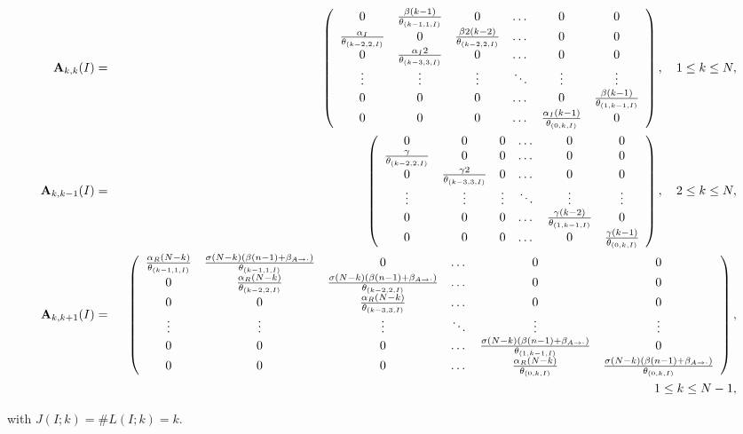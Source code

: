 \documentclass[10pt,A4paper]{article}
\begin{document}
\begin{eqnarray*}
 {\bf A}_{k,k}(I) &=& \left(\begin{array}{cccccc}
0 & \frac{\beta(k-1)}{\theta_{(k-1,1,I)}} & 0 & \dots & 0 & 0\\
\frac{\alpha_I}{\theta_{(k-2,2,I)}} & 0 & \frac{\beta2(k-2)}{\theta_{(k-2,2,I)}} & \dots & 0 & 0\\
0 & \frac{\alpha_I2}{\theta_{(k-3,3,I)}} & 0 & \dots & 0 & 0\\
\vdots & \vdots & \vdots & \ddots & \vdots & \vdots\\
0 & 0 & 0 & \dots & 0 & \frac{\beta(k-1)}{\theta_{(1,k-1,I)}}\\
0 & 0 & 0 & \dots & \frac{\alpha_I (k-1)}{\theta_{(0,k,I)}} & 0
                        \end{array}\right),\quad 1\leq k\leq N,\\
 {\bf A}_{k,k-1}(I) &=& \left(\begin{array}{cccccc}
0 & 0 & 0 & \dots & 0 & 0\\
\frac{\gamma}{\theta_{(k-2,2,I)}} & 0 & 0 & \dots & 0 & 0\\
0 & \frac{\gamma2}{\theta_{(k-3,3,I)}} & 0 & \dots & 0 & 0\\
\vdots & \vdots & \vdots & \ddots & \vdots & \vdots\\
0 & 0 & 0 & \dots & \frac{\gamma(k-2)}{\theta_{(1,k-1,I)}} & 0\\
0 & 0 & 0 & \dots & 0 & \frac{\gamma (k-1)}{\theta_{(0,k,I)}}
                        \end{array}\right),\quad 2\leq k\leq N,\\
 {\bf A}_{k,k+1}(I) &=& \left(\begin{array}{cccccc}
\frac{\alpha_R(N-k)}{\theta_{(k-1,1,I)}} & \frac{\sigma(N-k)(\beta(n-1)+\beta_{A\rightarrow\cdot})}{\theta_{(k-1,1,I)}} & 0 & \dots & 0 & 0\\
0 & \frac{\alpha_R(N-k)}{\theta_{(k-2,2,I)}} & \frac{\sigma(N-k)(\beta(n-1)+\beta_{A\rightarrow\cdot})}{\theta_{(k-2,2,I)}} & \dots & 0 & 0\\
0 & 0 & \frac{\alpha_R(N-k)}{\theta_{(k-3,3,I)}} & \dots & 0 & 0\\
\vdots & \vdots & \vdots & \ddots & \vdots & \vdots\\
0 & 0 & 0 & \dots & \frac{\sigma(N-k)(\beta(n-1)+\beta_{A\rightarrow\cdot})}{\theta_{(1,k-1,I)}} & 0\\
0 & 0 & 0 & \dots & \frac{\alpha_R(N-k)}{\theta_{(0,k,I)}} & \frac{\sigma(N-k)(\beta(n-1)+\beta_{A\rightarrow\cdot})}{\theta_{(0,k,I)}}
                        \end{array}\right),\\
                        && \quad\quad\quad\quad\quad\quad\quad\quad\quad\quad\quad\quad\quad\quad\quad\quad\quad\quad\quad\quad\quad\quad\quad\quad\quad\quad\quad\quad\quad\quad\quad\quad\quad\quad\quad\quad\quad\quad\quad\quad\quad\quad\quad 1\leq k\leq N-1,
\end{eqnarray*}
\par\noindent with $J(I;k)=\#L(I;k)=k$.\\
\end{document}
